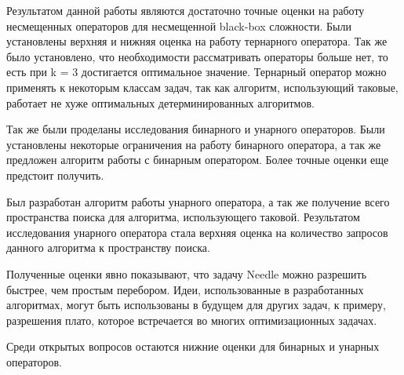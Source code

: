 \startconclusionpage

Результатом данной работы являются достаточно точные оценки на работу несмещенных операторов для несмещенной black-box сложности. Были установлены верхняя и нижняя оценка на работу тернарного оператора. Так же было установлено, что необходимости рассматривать операторы больше нет, то есть при k = 3 достигается оптимальное значение. Тернарный оператор можно применять к некоторым классам задач, так как алгоритм, использующий таковые, работает не хуже оптимальных детерминированных алгоритмов.  

Так же были проделаны исследования бинарного и унарного операторов. Были установлены некоторые ограничения на работу бинарного оператора, а так же предложен алгоритм работы с бинарным оператором. Более точные оценки еще предстоит получить.

Был разработан алгоритм работы унарного оператора, а так же получение всего пространства поиска для алгоритма, использующего таковой. Результатом исследования унарного оператора стала верхняя оценка на количество запросов данного алгоритма к пространству поиска. 

Полученные оценки явно показывают, что задачу Needle можно разрешить быстрее, чем простым перебором. Идеи, использованные в разработанных алгоритмах, могут быть использованы в будущем для других задач, к примеру, разрешения плато, которое встречается во многих оптимизационных задачах.

Среди открытых вопросов остаются нижние оценки для бинарных и унарных операторов.